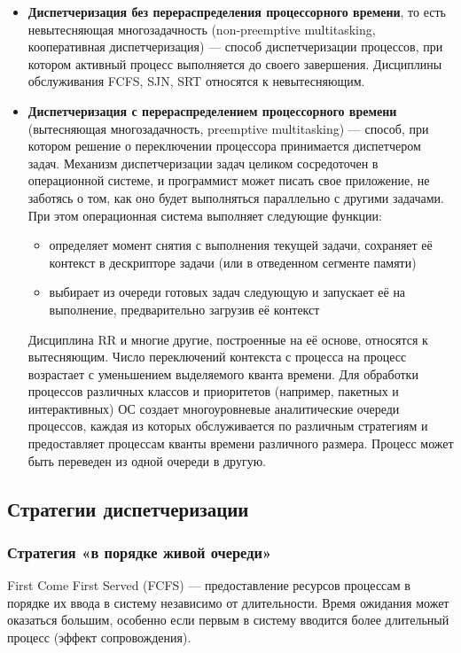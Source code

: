 \begin{itemize}
    \item \textbf{Диспетчеризация без перераспределения процессорного времени}, то есть невытесняющая многозадачность (non-preemptive multitasking, кооперативная диспетчеризация) — способ диспетчеризации процессов, при котором активный процесс выполняется до своего завершения. Дисциплины обслуживания FCFS, SJN, SRT относятся к невытесняющим.
    \item \textbf{Диспетчеризация с перераспределением процессорного времени} (вытесняющая многозадачность, preemptive multitasking) — способ, при котором решение о переключении процессора принимается диспетчером задач. Механизм диспетчеризации задач целиком сосредоточен в операционной системе, и программист может писать свое приложение, не заботясь о том, как оно будет выполняться параллельно с другими задачами. При этом операционная система выполняет следующие функции:
    \begin{itemize}
        \item определяет момент снятия с выполнения текущей задачи, сохраняет её контекст в дескрипторе задачи (или в отведенном сегменте памяти)
        \item выбирает из очереди готовых задач следующую и запускает её на выполнение, предварительно загрузив её контекст
    \end{itemize}
    
    Дисциплина RR и многие другие, построенные на её основе, относятся к вытесняющим.
    Число переключений контекста с процесса на процесс возрастает с уменьшением выделяемого кванта времени. 
    Для обработки процессов различных классов и приоритетов (например, пакетных и интерактивных) ОС создает многоуровневые аналитические очереди процессов, каждая из которых обслуживается по различным стратегиям и предоставляет процессам кванты времени различного размера. Процесс может быть переведен из одной очереди в другую.
\end{itemize}

\subsection{Стратегии диспетчеризации}
\subsubsection{Стратегия «в порядке живой очереди»}
First Come First Served (FCFS) — предоставление ресурсов процессам в порядке их ввода в систему независимо от длительности. Время ожидания может оказаться большим, особенно если первым в систему вводится более длительный процесс (эффект сопровождения).

